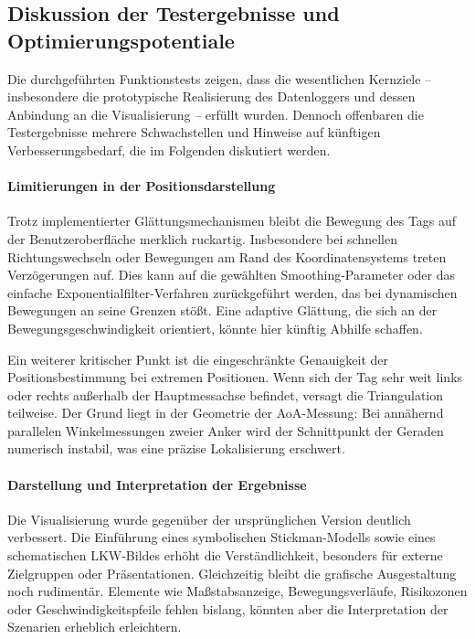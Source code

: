 \documentclass[a4paper, 12pt]{article} %
\begin{document}
\subsection{Diskussion der Testergebnisse und Optimierungspotentiale}

Die durchgeführten Funktionstests zeigen, dass die wesentlichen Kernziele – insbesondere die prototypische Realisierung des Datenloggers und 
dessen Anbindung an die Visualisierung – erfüllt wurden. Dennoch offenbaren die Testergebnisse mehrere Schwachstellen und Hinweise auf künftigen 
Verbesserungsbedarf, die im Folgenden diskutiert werden.

\paragraph{Limitierungen in der Positionsdarstellung}

Trotz implementierter Glättungsmechanismen bleibt die Bewegung des Tags auf der Benutzeroberfläche merklich ruckartig. Insbesondere bei 
schnellen Richtungswechseln oder Bewegungen am Rand des Koordinatensystems treten Verzögerungen auf. Dies kann auf die gewählten Smoothing-Parameter 
oder das einfache Exponentialfilter-Verfahren zurückgeführt werden, das bei dynamischen Bewegungen an seine Grenzen stößt. Eine adaptive Glättung, die 
sich an der Bewegungsgeschwindigkeit orientiert, könnte hier künftig Abhilfe schaffen.

Ein weiterer kritischer Punkt ist die eingeschränkte Genauigkeit der Positionsbestimmung bei extremen Positionen. Wenn sich der Tag sehr weit 
links oder rechts außerhalb der Hauptmessachse befindet, versagt die Triangulation teilweise. Der Grund liegt in der Geometrie der AoA-Messung: 
Bei annähernd parallelen Winkelmessungen zweier Anker wird der Schnittpunkt der Geraden numerisch instabil, was eine präzise Lokalisierung erschwert.

\paragraph{Darstellung und Interpretation der Ergebnisse}

Die Visualisierung wurde gegenüber der ursprünglichen Version deutlich verbessert. Die Einführung eines symbolischen Stickman-Modells sowie 
eines schematischen LKW-Bildes erhöht die Verständlichkeit, besonders für externe Zielgruppen oder Präsentationen. Gleichzeitig bleibt die 
grafische Ausgestaltung noch rudimentär. Elemente wie Maßstabsanzeige, Bewegungsverläufe, Risikozonen oder Geschwindigkeitspfeile fehlen bislang, 
könnten aber die Interpretation der Szenarien erheblich erleichtern.
\end{document}
